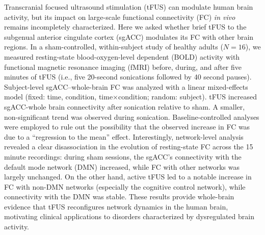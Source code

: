 Transcranial focused ultrasound stimulation (tFUS) can modulate human brain activity, but its impact on large-scale functional connectivity (FC) \emph{in vivo} remains incompletely characterized. Here we asked whether brief tFUS to the subgenual anterior cingulate cortex (sgACC) modulates its FC with other brain regions. In a sham-controlled, within-subject study of healthy adults ($N=16$), we measured resting-state blood-oxygen-level dependent (BOLD) activity with functional magnetic resonance imaging (fMRI) before, during, and after five minutes of tFUS (i.e., five 20-second sonications followed by 40 second pauses). Subject-level sgACC–whole-brain FC was analyzed with a linear mixed-effects model (fixed: time, condition, time×condition; random: subject). tFUS increased sgACC-whole brain connectivity after sonication relative to sham. A smaller, non-significant trend was observed during sonication. Baseline-controlled analyses were employed to rule out the possibility that the observed increase in FC was due to a ``regression to the mean'' effect. Interestingly, network-level analysis revealed a clear disassociation in the evolution of resting-state FC across the 15 minute recordings: during sham sessions, the sgACC's connectivity with the default mode network (DMN) increased, while FC with other networks was largely unchanged. On the other hand, active tFUS led to a notable increase in FC with non-DMN networks (especially the cognitive control network), while connectivity with the DMN was stable. These results provide whole-brain evidence that tFUS reconfigures network dynamics in the human brain, motivating clinical applications to disorders characterized by dysregulated brain activity.

